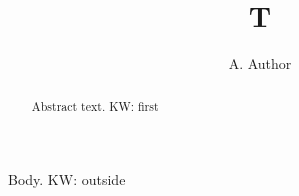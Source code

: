 \documentclass{kwmtt}
\newcommand{\keywords}[1]{KW: #1}
\begin{document}
\title{T}\author{A. Author}
\maketitle
\begin{abstract}
Abstract text.
\keywords{first}
\end{abstract}
Body. \keywords{outside}
\end{document}
